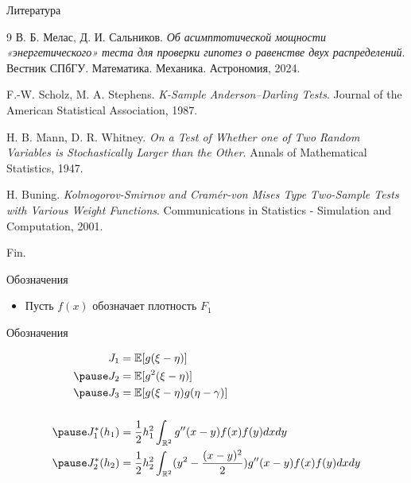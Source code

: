 \documentclass[handout]{beamer}
\begin{document}
\begin{frame}{Литература}
    \begin{thebibliography}{9}
    В. Б. Мелас, Д. И. Сальников.
    \textit{Об асимптотической мощности «энергетического» теста для проверки гипотез о равенстве двух распределений}.
    Вестник СПбГУ. Математика. Механика. Астрономия, 2024.
    
    F.-W. Scholz, M. A. Stephens.
    \textit{K-Sample Anderson–Darling Tests}.
    Journal of the American Statistical Association, 1987.
    
    H. B. Mann, D. R. Whitney.
    \textit{On a Test of Whether one of Two Random Variables is Stochastically Larger than the Other}.
    Annals of Mathematical Statistics, 1947.
    
    H. Buning.
    \textit{Kolmogorov-Smirnov and Cramér-von Mises Type Two-Sample Tests with Various Weight Functions}.
    Communications in Statistics - Simulation and Computation, 2001.
    \end{thebibliography}
\end{frame}


\begin{frame}
	\begin{center}
		Fin.
	\end{center}
\end{frame}



\begin{frame}{Обозначения}
	\begin{itemize}
		\item
		Пусть $f(x)$ обозначает плотность $F_1$
	\end{itemize}
\end{frame}

\begin{frame}{Обозначения}
	
	\begin{align*}
		J_1 &= \mathbb{E}[g(\xi - \eta)]\\
		\pause
		J_2 &= \mathbb{E}[g^2(\xi - \eta)] \\
		\pause
		J_3 &= \mathbb{E}[g(\xi - \eta)g(\eta - \gamma)] \\[0.2in]
		\pause
		J^*_1(h_1) &= \frac{1}{2}h^2_1 \int_{\mathbb{R}^2} g''(x-y)f(x)f(y)dxdy \\
		\pause
		J^*_2(h_2) &= \frac{1}{2}h^2_2 \int_{\mathbb{R}^2} (y^2-\frac{(x-y)^2}{2})g''(x-y)f(x)f(y)dxdy \\
	\end{align*}
	
\end{frame}
\end{document}
